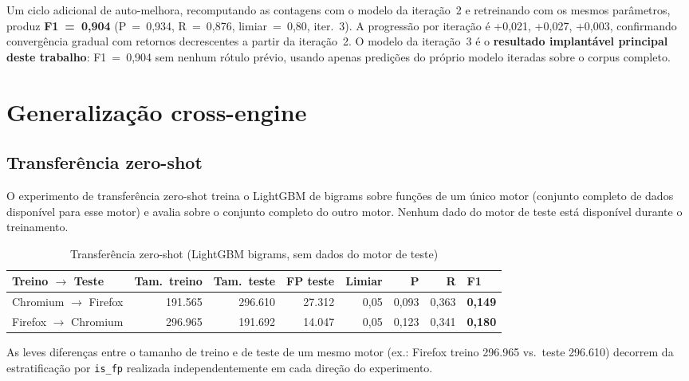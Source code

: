 Um ciclo adicional de auto-melhora, recomputando as contagens com o modelo da
iteração~2 e retreinando com os mesmos parâmetros, produz
\textbf{F1~=~0,904} (P~=~0,934, R~=~0,876, limiar~=~0,80, iter.~3). A progressão
por iteração é +0,021, +0,027, +0,003, confirmando convergência gradual com
retornos decrescentes a partir da iteração~2. O modelo da iteração~3 é o
\textbf{resultado implantável principal deste trabalho}: F1~=~0,904 sem nenhum
rótulo prévio, usando apenas predições do próprio modelo iteradas sobre o corpus
completo.

\section{Generalização cross-engine}
\label{sec:crossengine}

\subsection{Transferência zero-shot}
\label{sub:zeroshot}

O experimento de transferência zero-shot treina o LightGBM de bigrams sobre
funções de um único motor (conjunto completo de dados disponível para esse motor) e
avalia sobre o conjunto completo do outro motor. Nenhum dado do motor de teste está
disponível durante o treinamento.

\begin{table}[htb]
\centering
\caption{Transferência zero-shot (LightGBM bigrams, sem dados do motor de teste)}
\label{tab:zeroshot}
{\small
\begin{tabular}{lrrrrrrl}
\toprule
\textbf{Treino $\to$ Teste} & \textbf{Tam.\ treino} & \textbf{Tam.\ teste} & \textbf{FP teste} & \textbf{Limiar} & \textbf{P} & \textbf{R} & \textbf{F1} \\
\midrule
Chromium $\to$ Firefox & 191.565 & 296.610 & 27.312 & 0,05 & 0,093 & 0,363 & \textbf{0,149} \\
Firefox $\to$ Chromium & 296.965 & 191.692 & 14.047 & 0,05 & 0,123 & 0,341 & \textbf{0,180} \\
\bottomrule
\end{tabular}
}%
{\footnotesize As leves diferenças entre o tamanho de treino e de teste de um mesmo
motor (ex.: Firefox treino 296.965 vs.\ teste 296.610) decorrem da estratificação
por \texttt{is\_fp} realizada independentemente em cada direção do experimento.}

\end{table}

